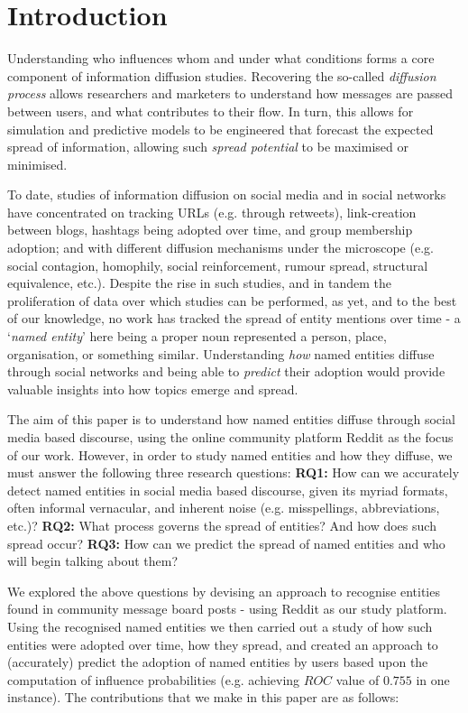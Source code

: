 \documentclass[review]{elsarticle}
\begin{document}
\section{Introduction}
Understanding who influences whom and under what conditions forms a core component of information diffusion studies.
Recovering the so-called \emph{diffusion process} allows researchers and marketers to understand how messages are passed between users, and what contributes to their flow.
In turn, this allows for simulation and predictive models to be engineered that forecast the expected spread of information, allowing such \emph{spread potential} to be maximised or minimised.

To date, studies of information diffusion on social media and in social networks have concentrated on tracking URLs (e.g. through retweets), link-creation between blogs, hashtags being adopted over time, and group membership adoption; and with different diffusion mechanisms under the microscope (e.g. social contagion, homophily, social reinforcement, rumour spread, structural equivalence, etc.).
Despite the rise in such studies, and in tandem the proliferation of data over which studies can be performed, as yet, and to the best of our knowledge, no work has tracked the spread of entity mentions over time - a `\emph{named entity}' here being a proper noun represented a person, place, organisation, or something similar.
Understanding \emph{how} named entities diffuse through social networks and being able to \emph{predict} their adoption would provide valuable insights into how topics emerge and spread.

The aim of this paper is to understand how named entities diffuse through social media based discourse, using the online community platform Reddit as the focus of our work.
However, in order to study named entities and how they diffuse, we must answer the following three research questions: \textbf{RQ1:} How can we accurately detect named entities in social media based discourse, given its myriad formats, often informal vernacular, and inherent noise (e.g. misspellings, abbreviations, etc.)? \textbf{RQ2:} What process governs the spread of entities? And how does such spread occur? \textbf{RQ3:} How can we predict the spread of named entities and who will begin talking about them?	

We explored the above questions by devising an approach to recognise entities found in community message board posts - using Reddit as our study platform.
Using the recognised named entities we then carried out a study of how such entities were adopted over time, how they spread, and created an approach to (accurately) predict the adoption of named entities by users based upon the computation of influence probabilities (e.g. achieving $ROC$ value of $0.755$ in one instance).
The contributions that we make in this paper are as follows:
\end{document}
